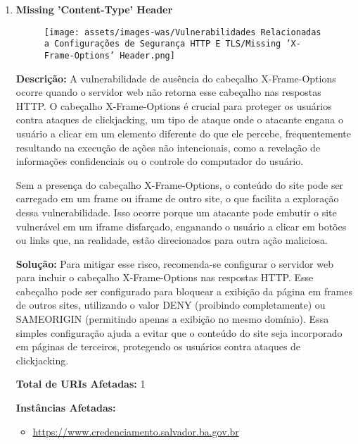 \documentclass[a4paper,12pt]{article}
\begin{document}
\begin{enumerate}
\item \textbf{Missing 'Content-Type' Header}

                        \begin{figure}[h!]
                        \centering
                        \texttt{[image: assets/images-was/Vulnerabilidades Relacionadas a Configurações de Segurança HTTP E TLS/Missing 'X-Frame-Options' Header.png]}
                        \end{figure}
                        \FloatBarrier
                        \textbf{Descrição:} A vulnerabilidade de ausência do cabeçalho X-Frame-Options ocorre quando o servidor web não retorna esse cabeçalho nas respostas HTTP. O cabeçalho X-Frame-Options é crucial para proteger os usuários contra ataques de clickjacking, um tipo de ataque onde o atacante engana o usuário a clicar em um elemento diferente do que ele percebe, frequentemente resultando na execução de ações não intencionais, como a revelação de informações confidenciais ou o controle do computador do usuário.

    Sem a presença do cabeçalho X-Frame-Options, o conteúdo do site pode ser carregado em um frame ou iframe de outro site, o que facilita a exploração dessa vulnerabilidade. Isso ocorre porque um atacante pode embutir o site vulnerável em um iframe disfarçado, enganando o usuário a clicar em botões ou links que, na realidade, estão direcionados para outra ação maliciosa.

\textbf{Solução:} Para mitigar esse risco, recomenda-se configurar o servidor web para incluir o cabeçalho X-Frame-Options nas respostas HTTP. Esse cabeçalho pode ser configurado para bloquear a exibição da página em frames de outros sites, utilizando o valor DENY (proibindo completamente) ou SAMEORIGIN (permitindo apenas a exibição no mesmo domínio). Essa simples configuração ajuda a evitar que o conteúdo do site seja incorporado em páginas de terceiros, protegendo os usuários contra ataques de clickjacking.

\textbf{Total de URIs Afetadas:} 1

\textbf{Instâncias Afetadas:}
\begin{itemize}
    \item \url{https://www.credenciamento.salvador.ba.gov.br}
\end{itemize}


\end{enumerate}
\end{document}
